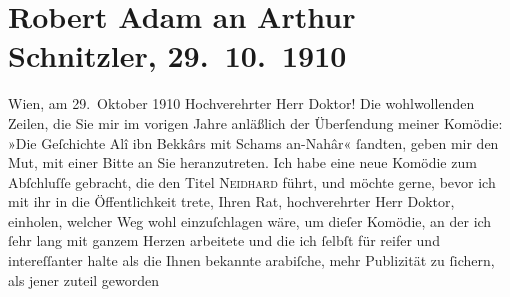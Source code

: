 

         \newcommand{\erwaehnteOrte}{Orte: Meidlinger Hauptstraße, Wien}
         \newcommand{\erwaehnteWerke}{Werke: Die Geschichte des Alî ibn Bekkâr mit Schams an-Nahâr, Neidhard}
               \section[Robert Adam an Arthur Schnitzler, 29. 10. 1910]{ Robert Adam an Arthur Schnitzler, 29. 10. 1910}\nopagebreak{}\rehead{ }\begin{ledgroupsized}[t]{13cm}\normalsize\beginnumbering \toendnotes[C]{\smallbreak\pagebreak[2]} 
\toendnotes[C]{\smallbreak}\pstart
           \raggedleft{}{\pb}Wien, am 29. Oktober 1910\pend
           \pstart{}Hochverehrter Herr Doktor!\pend\pstart
           Die wohlwollenden Zeilen, die Sie mir im vorigen Jahre anläßlich der Überſendung
                    meiner Komödie: »Die Geſchichte Alî ibn Bekkârs mit
                        Schams an-Nahâr« ſandten, geben mir den Mut, mit einer Bitte an Sie
                    heranzutreten.\pend
           \pstart
           Ich habe eine neue Komödie zum Abſchluſſe gebracht, die den Titel \textsc{Neidhard} führt, und möchte gerne, bevor ich mit ihr in die Öffentlichkeit trete,
                    {\pb}Ihren Rat, hochverehrter Herr Doktor, einholen,
                    welcher Weg wohl einzuſchlagen wäre, um dieſer Komödie, an der ich ſehr lang mit
                    ganzem Herzen arbeitete und die ich ſelbſt für reifer und intereſſanter halte
                    als die Ihnen bekannte arabiſche, mehr Publizität zu ſichern, als jener zuteil geworden

\end{ledgroupsized}
